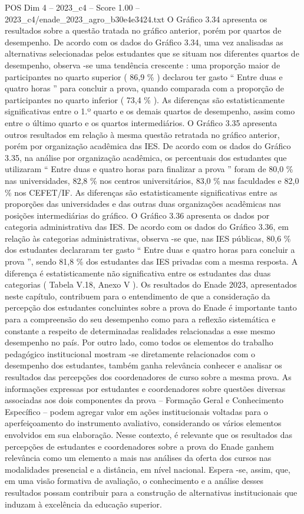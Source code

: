 \begin{textsample}{POS Dim 4 – 2023\_c4 – Score 1.00 – 2023\_c4/enade\_2023\_agro\_b30e4e3424.txt}
O Gráfico 3.34 apresenta os resultados sobre a questão tratada no gráfico anterior, porém por quartos de desempenho.
De acordo com os dados do Gráfico 3.34, uma vez analisadas as alternativas selecionadas pelos estudantes que se situam nos diferentes quartos de desempenho, observa -se uma tendência crescente : uma proporção maior de participantes no quarto superior ( 86,9 \% ) declarou ter gasto “ Entre duas e quatro horas ” para concluir a prova, quando comparada com a proporção de participantes no quarto inferior ( 73,4 \% ).
As diferenças são estatisticamente significativas entre o 1.º quarto e os demais quartos de desempenho, assim como entre o último quarto e os quartos intermediários.
O Gráfico 3.35 apresenta outros resultados em relação à mesma questão retratada no gráfico anterior, porém por organização acadêmica das IES.
De acordo com os dados do Gráfico 3.35, na análise por organização acadêmica, os percentuais dos estudantes que utilizaram “ Entre duas e quatro horas para finalizar a prova ” foram de 80,0 \% nas universidades, 82,8 \% nos centros universitários, 83,0 \% nas faculdades e 82,0 \% nos CEFET/IF.
As diferenças são estatisticamente significativas entre as proporções das universidades e das outras duas organizações acadêmicas nas posições intermediárias do gráfico.
O Gráfico 3.36 apresenta os dados por categoria administrativa das IES.
De acordo com os dados do Gráfico 3.36, em relação às categorias administrativas, observa -se que, nas IES públicas, 80,6 \% dos estudantes declararam ter gasto “ Entre duas e quatro horas para concluir a prova ”, sendo 81,8 \% dos estudantes das IES privadas com a mesma resposta.
A diferença é estatisticamente não significativa entre os estudantes das duas categorias ( Tabela V.18, Anexo V ).
Os resultados do Enade 2023, apresentados neste capítulo, contribuem para o entendimento de que a consideração da percepção dos estudantes concluintes sobre a prova do Enade é importante tanto para a compreensão do seu desempenho como para a reflexão sistemática e constante a respeito de determinadas realidades relacionadas a esse mesmo desempenho no país.
Por outro lado, como todos os elementos do trabalho pedagógico institucional mostram -se diretamente relacionados com o desempenho dos estudantes, também ganha relevância conhecer e analisar os resultados das percepções dos coordenadores de curso sobre a mesma prova.
As informações expressas por estudantes e coordenadores sobre questões diversas associadas aos dois componentes da prova – Formação Geral e Conhecimento Específico – podem agregar valor em ações institucionais voltadas para o aperfeiçoamento do instrumento avaliativo, considerando os vários elementos envolvidos em sua elaboração.
Nesse contexto, é relevante que os resultados das percepções de estudantes e coordenadores sobre a prova do Enade ganhem relevância como um elemento a mais nas análises da oferta dos cursos nas modalidades presencial e a distância, em nível nacional.
Espera -se, assim, que, em uma visão formativa de avaliação, o conhecimento e a análise desses resultados possam contribuir para a construção de alternativas institucionais que induzam à excelência da educação superior.

\end{textsample}
